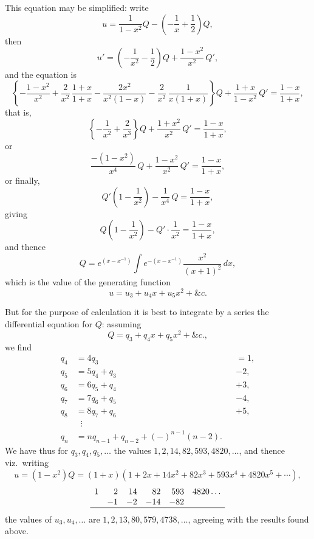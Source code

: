 \documentclass[11pt,a4paper]{article}
\begin{document}
\medskip

This equation may be simplified: write
\[
u = \frac{1}{1 - x^{2}}Q - \left(-\frac{1}{x} + \frac{1}{2}\right)Q,
\]
then
\[
u' = \left(-\frac{1}{x^{2}} - \frac{1}{2}\right)Q + \frac{1 - x^{2}}{x^{2}}\,Q',
\]
and the equation is
\[
\left\{-\frac{1 - x^{2}}{x^{2}} + \frac{2}{x^{2}}\,\frac{1 + x}{1 + x} - \frac{2x^{2}}{x^{2}(1 - x)} - \frac{2}{x^{2}}\,\frac{1}{x(1 + x)}\right\}Q + \frac{1 + x}{1 - x^{2}}\,Q' = \frac{1 - x}{1 + x},
\]
that is,
\[
\left\{-\frac{1}{x^{2}} + \frac{2}{x^{3}}\right\}Q + \frac{1 + x^{2}}{x^{2}}\,Q' = \frac{1 - x}{1 + x},
\]
or
\[
\frac{-(1 - x^{2})}{x^{4}}\,Q + \frac{1 - x^{2}}{x^{2}}\,Q' = \frac{1 - x}{1 + x},
\]
or finally,
\[
Q'\left(1 - \frac{1}{x^{2}}\right) - \frac{1}{x^{4}}\,Q = \frac{1 - x}{1 + x},
\]
giving
\[
Q\left(1 - \frac{1}{x^{2}}\right) - Q'\cdot\frac{1}{x^{2}} = \frac{1 - x}{1 + x},
\]
and thence
\[
Q = e^{(x - x^{-1})}\int e^{-(x - x^{-1})}\frac{x^{2}}{(x + 1)^{2}}\,dx,
\]
which is the value of the generating function
\[
u = u_{3} + u_{4}x + u_{5}x^{2} + \&c.
\]

\newpage


\noindent But for the purpose of calculation it is best to integrate by a series the differential equation for $Q$: assuming
\[
Q = q_{3} + q_{4}x + q_{5}x^{2} + \&c.,
\]
we find
\begin{align*}
q_{4} &= 4q_{3} \quad &&= 1,\\
q_{5} &= 5q_{4} + q_{3} \quad &&- 2,\\
q_{6} &= 6q_{5} + q_{4} \quad &&+ 3,\\
q_{7} &= 7q_{6} + q_{5} \quad &&- 4,\\
q_{8} &= 8q_{7} + q_{6} \quad &&+ 5,\\
\quad &\;\;\vdots \\
q_{n} &= n q_{n-1} + q_{n-2} + (-)^{n-1}(n - 2).
\end{align*}
We have thus for $q_{3}, q_{4}, q_{5}, \ldots$ the values $1, 2, 14, 82, 593, 4820, \ldots$, and thence viz.\ writing
\[
u = (1 - x^{2})Q = (1 + x)(1 + 2x + 14x^{2} + 82x^{3} + 593x^{4} + 4820x^{5} + \cdots),
\]
\[
\begin{array}{rrrrrr}
1 & 2 & 14 & 82 & 593 & 4820 \ldots\\
& -1 & -2 & -14 & -82 & \\
\hline
\end{array}
\]
the values of $u_{3}, u_{4}, \ldots$ are $1, 2, 13, 80, 579, 4738, \ldots$, agreeing with the results found above.
\end{document}
